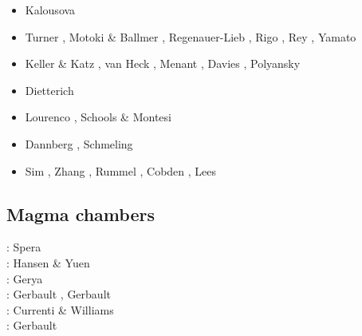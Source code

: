 \begin{scriptsize}
\begin{itemize}
\item[\twothousandfourteen] Kalousova \etal \cite{kast14}
\item[\twothousandfifteen] Turner \etal \cite{tukb15}, Motoki \& Ballmer \cite{moba15},
                           Regenauer-Lieb \etal \cite{rerl15}, Rigo \etal \cite{riag15},
                           Rey \cite{rey15}, Yamato \etal \cite{yadm15}
\item[\twothousandsixteen] Keller \& Katz \cite{keka16}, van Heck \etal \cite{vade16},
                           Menant \etal \cite{mesj16}, Davies \etal \cite{dalg16},
                           Polyansky \etal \cite{porb16} 
\item[\twothousandseventeen] Dietterich \etal \cite{dilc17}
\item[\twothousandeighteen] Lourenco \etal \cite{lorg18}, Schools \& Montesi \cite{scmo18}
\item[\twothousandnineteen] Dannberg \etal \cite{dagg19}, Schmeling \etal \cite{scmw19}
\item[\twothousandtwenty] Sim \etal \cite{siss20}, Zhang \etal \cite{zhbp20}, 
                          Rummel \etal \cite{rubk20,rukb20}, Cobden \cite{cobd20},
                          Lees \etal \cite{lerm20}
\end{itemize}
\end{scriptsize}

\subsection{Magma chambers}

\begin{scriptsize}
\nineteeneightytwo: Spera \etal \cite{spyk82}\\
\nineteeneightyseven: Hansen \& Yuen \cite{hayu87}\\
\twothousandfour: Gerya \etal \cite{geys04}\\
\twothousandtwelve: Gerbault \cite{gerb12}, Gerbault \etal \cite{gech12}\\
\twothousandfourteen: Currenti \& Williams \cite{cuwi14}\\
\twothousandeighteen: Gerbault \etal \cite{gehn18}
\end{scriptsize}

